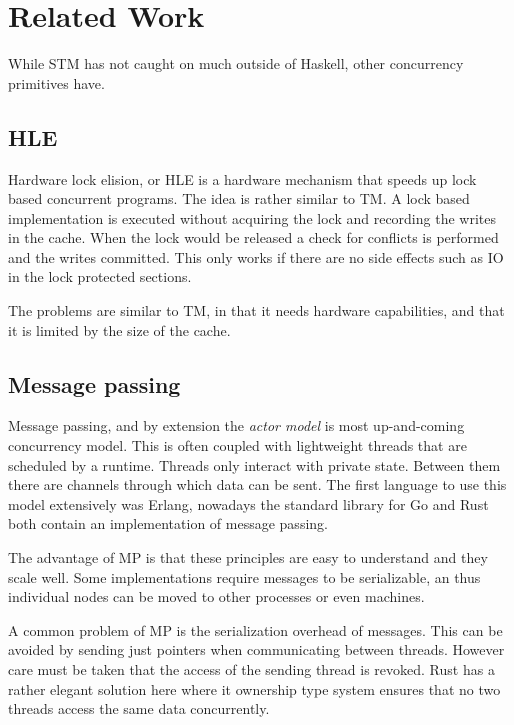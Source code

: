 \section{Related Work}

\label{sec:related-work}

While STM has not caught on much outside of Haskell, other concurrency
primitives have.

\subsection{HLE}

Hardware lock elision, or HLE is a hardware mechanism that speeds up lock based
concurrent programs. The idea is rather similar to TM. A lock based
implementation is executed without acquiring the lock and recording the writes
in the cache. When the lock would be released a check for conflicts is performed
and the writes committed. This only works if there are no side effects such as
IO in the lock protected sections.

The problems are similar to TM, in that it needs hardware capabilities, and that
it is limited by the size of the cache.

\subsection{Message passing}

Message passing, and by extension the \emph{actor model} is most up-and-coming
concurrency model. This is often coupled with lightweight threads that are
scheduled by a runtime. Threads only interact with private state. Between them
there are channels through which data can be sent. The first language to use
this model extensively was Erlang, nowadays the standard library for Go and Rust
both contain an implementation of message passing.

The advantage of MP is that these principles are easy to understand and they
scale well. Some implementations require messages to be serializable, an thus
individual nodes can be moved to other processes or even machines.

A common problem of MP is the serialization overhead of messages. This can be
avoided by sending just pointers when communicating between threads. However
care must be taken that the access of the sending thread is revoked. Rust has a
rather elegant solution here where it ownership type system ensures that no two
threads access the same data concurrently.
